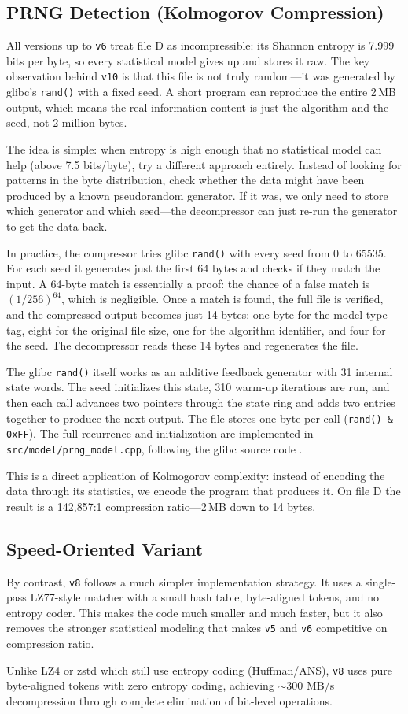 \subsection{PRNG Detection (Kolmogorov Compression)}
All versions up to \texttt{v6} treat file D as incompressible: its Shannon entropy is 7.999 bits per byte, so every statistical model gives up and stores it raw. The key observation behind \texttt{v10} is that this file is not truly random---it was generated by glibc's \texttt{rand()} with a fixed seed. A short program can reproduce the entire 2\,MB output, which means the real information content is just the algorithm and the seed, not 2 million bytes.

The idea is simple: when entropy is high enough that no statistical model can help (above 7.5 bits/byte), try a different approach entirely. Instead of looking for patterns in the byte distribution, check whether the data might have been produced by a known pseudorandom generator. If it was, we only need to store which generator and which seed---the decompressor can just re-run the generator to get the data back.

In practice, the compressor tries glibc \texttt{rand()} with every seed from 0 to 65535. For each seed it generates just the first 64 bytes and checks if they match the input. A 64-byte match is essentially a proof: the chance of a false match is $(1/256)^{64}$, which is negligible. Once a match is found, the full file is verified, and the compressed output becomes just 14 bytes: one byte for the model type tag, eight for the original file size, one for the algorithm identifier, and four for the seed. The decompressor reads these 14 bytes and regenerates the file.

The glibc \texttt{rand()} itself works as an additive feedback generator with 31 internal state words. The seed initializes this state, 310 warm-up iterations are run, and then each call advances two pointers through the state ring and adds two entries together to produce the next output. The file stores one byte per call (\texttt{rand() \& 0xFF}). The full recurrence and initialization are implemented in \texttt{src/model/prng\_model.cpp}, following the glibc source code \cite{glibcrand}.

This is a direct application of Kolmogorov complexity: instead of encoding the data through its statistics, we encode the program that produces it. On file D the result is a 142,857:1 compression ratio---2\,MB down to 14 bytes.

\subsection{Speed-Oriented Variant}
By contrast, \texttt{v8} follows a much simpler implementation strategy. It uses a single-pass LZ77-style matcher with a small hash table, byte-aligned tokens, and no entropy coder. This makes the code much smaller and much faster, but it also removes the stronger statistical modeling that makes \texttt{v5} and \texttt{v6} competitive on compression ratio.

Unlike LZ4 or zstd which still use entropy coding (Huffman/ANS), \texttt{v8} uses pure byte-aligned tokens with zero entropy coding, achieving $\sim$300 MB/s decompression through complete elimination of bit-level operations.
